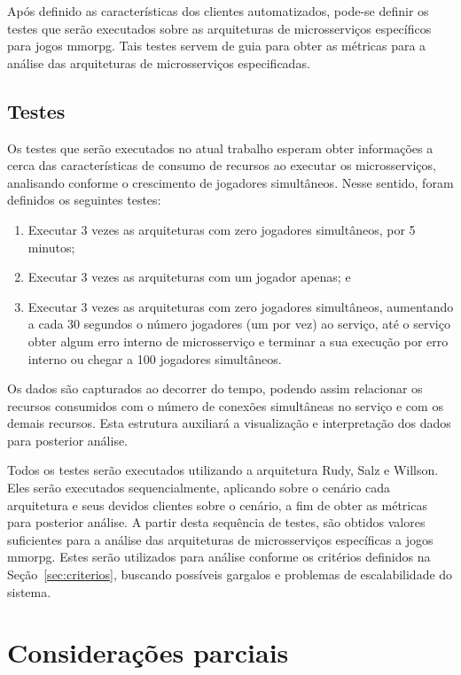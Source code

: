 Após definido as características dos clientes automatizados, pode-se definir os testes que serão executados sobre as arquiteturas de microsserviços específicos para jogos \ac{mmorpg}.
%
Tais testes servem de guia para obter as métricas para a análise das arquiteturas de microsserviços especificadas.

\subsection{Testes}
\label{sec:cap4_testes}

Os testes que serão executados no atual trabalho esperam obter informações a cerca das características de consumo de recursos ao  executar os microsserviços, analisando conforme o crescimento de jogadores simultâneos.
%
Nesse sentido, foram definidos os seguintes testes:

\begin{enumerate}
  \item Executar 3 vezes as arquiteturas com zero jogadores simultâneos, por 5 minutos;
  \item Executar 3 vezes as arquiteturas com um jogador apenas; e
  \item Executar 3 vezes as arquiteturas com zero jogadores simultâneos, aumentando a cada 30 segundos o número jogadores (um por vez) ao serviço, até o serviço obter algum erro interno de microsserviço e terminar a sua execução por erro interno ou chegar a 100 jogadores simultâneos.
\end{enumerate}

Os dados são capturados ao decorrer do tempo, podendo assim relacionar os recursos consumidos com o número de conexões simultâneas no serviço e com os demais recursos.
%
Esta estrutura auxiliará a visualização e interpretação dos dados para posterior análise.

Todos os testes serão executados utilizando a arquitetura Rudy, Salz e Willson.
%
Eles serão executados sequencialmente, aplicando sobre o cenário cada arquitetura e seus devidos clientes sobre o cenário, a fim de obter as métricas para posterior análise.
%
A partir desta sequência de testes, são obtidos valores suficientes para a análise das arquiteturas de microsserviços específicas a jogos \ac{mmorpg}.
%
Estes serão utilizados para análise conforme os critérios definidos na Seção~\ref{sec:criterios}, buscando possíveis gargalos e problemas de escalabilidade do sistema.


\section{Considerações parciais}


